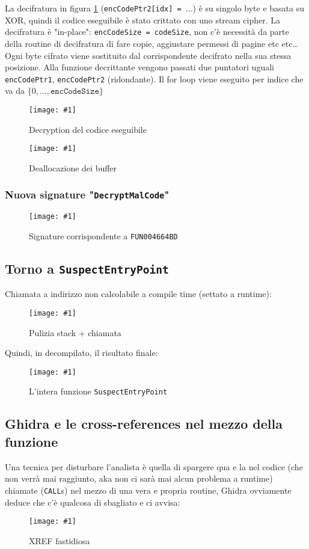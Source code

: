 \documentclass[
    a4paper, %
    11pt %
]{article}
\newcommand{\pic}[4]{\begin{figure}[H]
            \centering
            \texttt{[image: \#1]}
            \caption{#2}
            \label{fig:#1}
            \end{figure}}
\begin{document}
            La decifratura in figura \ref{fig:dec_decrypt_inplace_new} (\texttt{encCodePtr2[\textunderscore idx] = $\dots$}) è su 
            singolo byte e basata su XOR,
            quindi il codice eseguibile è stato crittato con uno stream cipher. La decifratura
            è "in-place": \texttt{encCodeSize = codeSize}, non c'è necessità da parte della routine di
            decifratura di fare copie, aggiustare permessi di pagine etc etc\dots Ogni byte cifrato viene
            sostituito dal corrispondente decifrato nella sua stessa posizione.
            Alla funzione decrittante vengono passati due puntatori uguali \texttt{encCodePtr1}, 
            \texttt{encCodePtr2} (ridondante). Il for loop viene eseguito per indice che va da $\{ 0, 
            ..., \texttt{encCodeSize} \}$
            \pic{dec_decrypt_inplace_new}{Decryption del codice eseguibile}{15cm}{5.5cm}

            \pic{dec_cleanup_new}{Deallocazione dei buffer}{8cm}{2.5cm}

            \subsubsection{Nuova signature "\texttt{DecryptMalCode}"}

            \pic{dec_signature_new}{Signature corrispondente a \texttt{FUN\textunderscore 004664BD}}
            {18cm}{1.5cm}

            \subsection{Torno a \texttt{SuspectEntryPoint}}

            Chiamata a indirizzo non calcolabile a compile time (settato a runtime):
            \pic{see_final_call}{Pulizia stack + chiamata}{16cm}{1.5cm}

            Quindi, in decompilato, il risultato finale:
            \pic{see_final_decomp}{L'intera funzione \texttt{SuspectEntryPoint}}{17cm}{10cm}

            \subsection*{Ghidra e le cross-references nel mezzo della funzione}

            Una tecnica per disturbare l'analista è quella di spargere qua e la nel codice (che non verrà 
            mai raggiunto, aka non ci sarà mai alcun problema a runtime) chiamate (\texttt{CALL}s) nel 
            mezzo di una vera e propria routine, Ghidra ovviamente deduce che c'è qualcosa di sbagliato
            e ci avvisa:
            \pic{ghidra_midcall_xrefs}{XREF fastidiosa}{19cm}{3cm}
\end{document}
